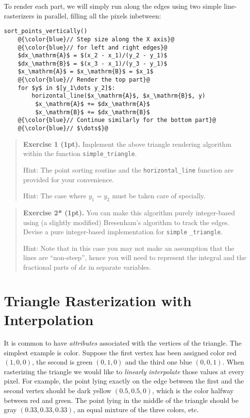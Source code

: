 \documentclass{article}
\newenvironment{exercise}[2]{\begin{verse}\textbf{Exercise #1 (#2pt).} }{
\end{verse}\medskip}
\begin{document}
To render each part, we will simply run along the edges using two simple line-rasterizers in parallel, filling all the pixels inbetween:

\begin{lstlisting}[escapechar=@]
   sort_points_vertically()
	@{\color{blue}// Step size along the X axis}@
	@{\color{blue}// for left and right edges}@
	$dx_\mathrm{A}$ = $(x_2 - x_1)/(y_2 - y_1)$
	$dx_\mathrm{B}$ = $(x_3 - x_1)/(y_3 - y_1)$
	$x_\mathrm{A}$ = $x_\mathrm{B}$ = $x_1$
	@{\color{blue}// Render the top part}@
	for $y$ in $[y_1\dots y_2]$:
		horizontal_line($x_\mathrm{A}$, $x_\mathrm{B}$, y)
		 $x_\mathrm{A}$ += $dx_\mathrm{A}$
		 $x_\mathrm{B}$ += $dx_\mathrm{B}$
	@{\color{blue}// Continue similarly for the bottom part}@
	@{\color{blue}// $\dots$}@
\end{lstlisting}

\begin{exercise}{1}{1}
Implement the above triangle rendering algorithm within the function \verb#simple_triangle#.

Hint: The point sorting routine and the \verb#horizontal_line# function are provided for your convenience.

Hint: The case where $y_1 = y_2$ must be taken care of specially.
\end{exercise}

\begin{exercise}{2*}{1}
You can make this algorithm purely integer-based using (a slightly modified) Bresenham's algorithm to track the edges. Devise a pure integer-based implementation for \texttt{simple} \verb#_triangle#. 

Hint: Note that in this case you may not make an assumption that the lines are ``non-steep'', hence you will need to represent the integral and the fractional parts of $dx$ in separate variables.
\end{exercise}

\section{Triangle Rasterization with Interpolation}
It is common to have \emph{attributes} associated with the vertices of the triangle. The simplest example is color. Suppose the first vertex has been assigned color red $(1,0,0)$, the second is green $(0,1,0)$ and the third one blue $(0,0,1)$. When rasterizing the triangle we would like to \emph{linearly interpolate} those values at every pixel. For example, the point lying exactly on the edge between the first and the second vertex should be dark yellow $(0.5, 0.5, 0)$, which is the color halfway between red and green. The point lying in the middle of the triangle should be gray $(0.33, 0.33, 0.33)$, an equal mixture of the three colors, etc.
\end{document}
